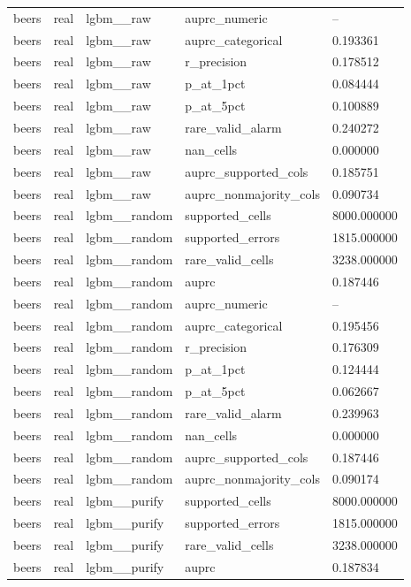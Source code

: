 \begin{tabular}{lllll}
beers & real & lgbm\_\_raw & auprc\_numeric & -- \\
beers & real & lgbm\_\_raw & auprc\_categorical & 0.193361 \\
beers & real & lgbm\_\_raw & r\_precision & 0.178512 \\
beers & real & lgbm\_\_raw & p\_at\_1pct & 0.084444 \\
beers & real & lgbm\_\_raw & p\_at\_5pct & 0.100889 \\
beers & real & lgbm\_\_raw & rare\_valid\_alarm & 0.240272 \\
beers & real & lgbm\_\_raw & nan\_cells & 0.000000 \\
beers & real & lgbm\_\_raw & auprc\_supported\_cols & 0.185751 \\
beers & real & lgbm\_\_raw & auprc\_nonmajority\_cols & 0.090734 \\
beers & real & lgbm\_\_random & supported\_cells & 8000.000000 \\
beers & real & lgbm\_\_random & supported\_errors & 1815.000000 \\
beers & real & lgbm\_\_random & rare\_valid\_cells & 3238.000000 \\
beers & real & lgbm\_\_random & auprc & 0.187446 \\
beers & real & lgbm\_\_random & auprc\_numeric & -- \\
beers & real & lgbm\_\_random & auprc\_categorical & 0.195456 \\
beers & real & lgbm\_\_random & r\_precision & 0.176309 \\
beers & real & lgbm\_\_random & p\_at\_1pct & 0.124444 \\
beers & real & lgbm\_\_random & p\_at\_5pct & 0.062667 \\
beers & real & lgbm\_\_random & rare\_valid\_alarm & 0.239963 \\
beers & real & lgbm\_\_random & nan\_cells & 0.000000 \\
beers & real & lgbm\_\_random & auprc\_supported\_cols & 0.187446 \\
beers & real & lgbm\_\_random & auprc\_nonmajority\_cols & 0.090174 \\
beers & real & lgbm\_\_purify & supported\_cells & 8000.000000 \\
beers & real & lgbm\_\_purify & supported\_errors & 1815.000000 \\
beers & real & lgbm\_\_purify & rare\_valid\_cells & 3238.000000 \\
beers & real & lgbm\_\_purify & auprc & 0.187834 \\

\end{tabular}
